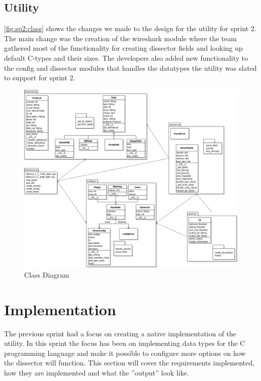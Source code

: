 \subsection{Utility}
\autoref{fig:sp2:class} shows the changes we made to the design for the utility for sprint 2. The main change was the creation of the wireshark module where the team gathered most of the functionality for creating dissector fields and looking up default C-types and their sizes. The developers also added new functionality to the config and dissector modules that handles the datatypes the utility was slated to support for sprint 2.
\begin{figure}[!htb]
	\center
	\includegraphics[width=\textwidth]{./sprints/img/class_diagram_s2}
	\caption{Class Diagram\label{fig:sp2:class}}
\end{figure}




\section{Implementation}

The previous sprint had a focus on creating a native implementation of the 
utility. In this sprint the focus has been on implementing data types for the 
C programming language and make it possible to configure more options on how 
the dissector will function. This section will cover the requirements 
implemented, how they are implemented and what the ''output'' look like.

